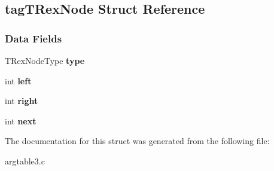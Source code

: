 \hypertarget{structtagTRexNode}{}\subsection{tag\+T\+Rex\+Node Struct Reference}
\label{structtagTRexNode}
\subsubsection*{Data Fields}
\begin{DoxyCompactItemize}
\item 
\mbox{\label{structtagTRexNode_a24e6220291da90346d9a0780cfad7c7f}} 
T\+Rex\+Node\+Type {\bfseries type}
\item 
\mbox{\label{structtagTRexNode_a4d1d697c3c82b29a41e6b4be0640da92}} 
int {\bfseries left}
\item 
\mbox{\label{structtagTRexNode_a95eb4fe058e12dc38fd7126f2956633a}} 
int {\bfseries right}
\item 
\mbox{\label{structtagTRexNode_a9722e37dadf65b6fac9d8d9ce942b060}} 
int {\bfseries next}
\end{DoxyCompactItemize}


The documentation for this struct was generated from the following file\+:\begin{DoxyCompactItemize}
\item 
argtable3.\+c\end{DoxyCompactItemize}
